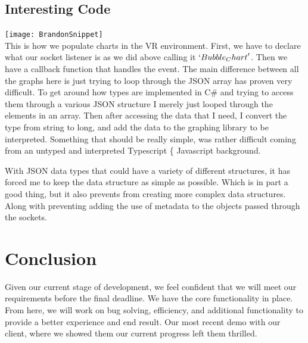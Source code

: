 \documentclass[onecolumn, draftclsnofoot,10pt, compsoc]{IEEEtran}
\begin{document}
    \subsection{Interesting Code}


        \texttt{[image: BrandonSnippet]}\\

    This is how we populate charts in the VR environment. First, we have to declare what our socket listener is as we did above calling it $\lq{Bubble_Chart}\rq$. Then we have a callback function that handles the event. The main difference between all the graphs here is just trying to loop through the JSON array has proven very difficult. To get around how types are implemented in C\# and trying to access them through a various JSON structure I merely just looped through the elements in an array. Then after accessing the data that I need, I convert the type from string to long, and add the data to the graphing library to be interpreted. Something that should be really simple, was rather difficult coming from an untyped and interpreted Typescript \{ Javascript background.

    With JSON data types that could have a variety of different structures, it has forced me to keep the data structure as simple as possible. Which is in part a good thing, but it also prevents from creating more complex data structures. Along with preventing adding the use of metadata to the objects passed through the sockets.

\section{Conclusion}
  Given our current stage of development, we feel confident that we will meet our requirements before the final deadline. We have the core functionality in place. From here, we will work on bug solving, efficiency, and additional functionality to provide a better experience and end result. Our most recent demo with our client, where we showed them our current progress left them thrilled. 
\end{document}
